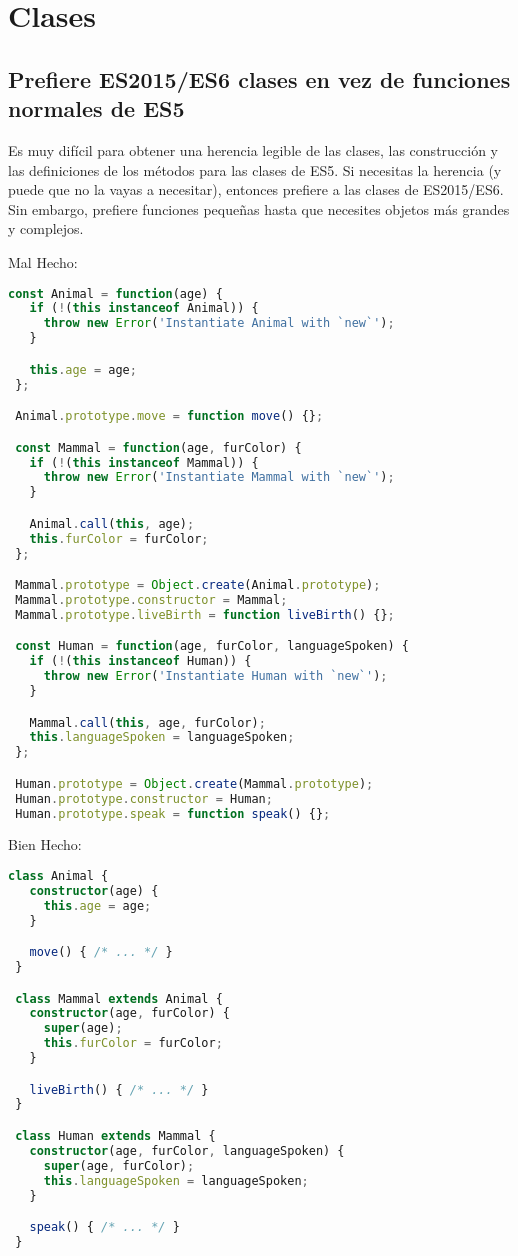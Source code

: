 \section{Clases}

\subsection*{Prefiere ES2015/ES6 clases en vez de funciones normales de ES5}

Es muy difícil para obtener una herencia legible de las clases, las construcción y las definiciones de los métodos para las clases de ES5. Si necesitas la herencia (y puede que no la vayas a necesitar), entonces prefiere a las clases de ES2015/ES6. Sin embargo, prefiere funciones pequeñas hasta que necesites objetos más grandes y complejos.

Mal Hecho:

\begin{lstlisting}[language=TypeScript, style=badstyle]
 const Animal = function(age) {
   if (!(this instanceof Animal)) {
     throw new Error('Instantiate Animal with `new`');
   }

   this.age = age;
 };

 Animal.prototype.move = function move() {};

 const Mammal = function(age, furColor) {
   if (!(this instanceof Mammal)) {
     throw new Error('Instantiate Mammal with `new`');
   }

   Animal.call(this, age);
   this.furColor = furColor;
 };

 Mammal.prototype = Object.create(Animal.prototype);
 Mammal.prototype.constructor = Mammal;
 Mammal.prototype.liveBirth = function liveBirth() {};

 const Human = function(age, furColor, languageSpoken) {
   if (!(this instanceof Human)) {
     throw new Error('Instantiate Human with `new`');
   }

   Mammal.call(this, age, furColor);
   this.languageSpoken = languageSpoken;
 };

 Human.prototype = Object.create(Mammal.prototype);
 Human.prototype.constructor = Human;
 Human.prototype.speak = function speak() {};
\end{lstlisting}
\newpage

Bien Hecho:
\begin{lstlisting}[language=TypeScript, style=goodstyle]
 class Animal {
   constructor(age) {
     this.age = age;
   }

   move() { /* ... */ }
 }

 class Mammal extends Animal {
   constructor(age, furColor) {
     super(age);
     this.furColor = furColor;
   }

   liveBirth() { /* ... */ }
 }

 class Human extends Mammal {
   constructor(age, furColor, languageSpoken) {
     super(age, furColor);
     this.languageSpoken = languageSpoken;
   }

   speak() { /* ... */ }
 }
\end{lstlisting}
